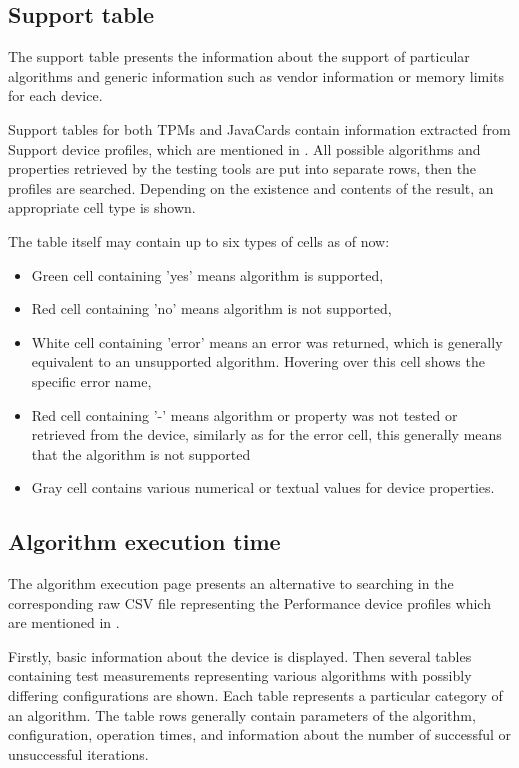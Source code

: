\subsection{Support table}
The support table presents the information about the support of particular algorithms and generic information such as vendor information or memory limits for each device.

Support tables for both TPMs and JavaCards contain information extracted from Support device profiles, which are mentioned in . All possible algorithms and properties retrieved by the testing tools are put into separate rows, then the profiles are searched. Depending on the existence and contents of the result, an appropriate cell type is shown. 

The table itself may contain up to six types of cells as of now:
\begin{itemize}
    \item Green cell containing 'yes' means algorithm is supported,
    \item Red cell containing 'no' means algorithm is not supported,
    \item White cell containing 'error' means an error was returned, which is generally equivalent to an unsupported algorithm. Hovering over this cell shows the specific error name,
    \item Red cell containing '-' means algorithm or property was not tested or retrieved from the device, similarly as for the error cell, this generally means that the algorithm is not supported
    \item Gray cell contains various numerical or textual values for device properties.
\end{itemize}



\subsection{Algorithm execution time}
The algorithm execution page presents an alternative to searching in the corresponding raw CSV file representing the Performance device profiles which are mentioned in  . 

Firstly, basic information about the device is displayed. Then several tables containing test measurements representing various algorithms with possibly differing configurations are shown. Each table represents a particular category of an algorithm. The table rows generally contain parameters of the algorithm, configuration, operation times, and information about the number of successful or unsuccessful iterations.


